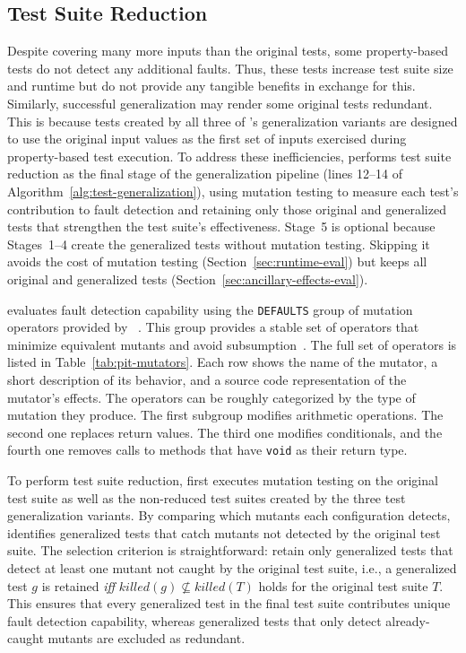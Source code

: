 \subsection{Test Suite Reduction}
\label{sec:test-suite-reduction}

Despite covering many more inputs than the original tests,
some property-based tests do not detect any additional faults.
Thus, these tests increase test suite size and runtime
but do not provide any tangible benefits in exchange for this.
Similarly, successful generalization may render some original tests redundant.
This is because tests created by all three of \ToolTeralizer{}'s generalization variants
are designed to use the original input values as the first
set of inputs exercised during property-based test execution.
To address these inefficiencies,
\ToolTeralizer{} performs test suite reduction
as the final stage of the generalization pipeline
(lines 12--14 of Algorithm~\ref{alg:test-generalization}),
using mutation testing to measure each test's contribution to fault detection
and retaining only those original and generalized tests
that strengthen the test suite's effectiveness.
Stage~5 is optional because Stages~1--4 create the generalized tests without mutation testing.
Skipping it avoids the cost of mutation testing (Section~\ref{sec:runtime-eval})
but keeps all original and generalized tests (Section~\ref{sec:ancillary-effects-eval}).

\ToolTeralizer{} evaluates fault detection capability
using the \texttt{DEFAULTS} group of mutation operators
provided by \ToolPit{}~\cite{coles_2016_pit}.
This group provides a stable set of operators that minimize equivalent mutants
and avoid subsumption~\cite{coles_2021_less_is_more, coles_pit_mutators}.
The full set of operators
is listed in Table~\ref{tab:pit-mutators}.
Each row shows the name of the mutator,
a short description of its behavior,
and a source code representation
of the mutator's effects.
The operators can be roughly categorized by the type of mutation they produce.
The first subgroup modifies arithmetic operations.
The second one replaces return values.
The third one modifies conditionals,
and the fourth one removes calls to methods
that have \texttt{void} as their return type.

To perform test suite reduction, \ToolTeralizer{}
first executes mutation testing on the original
test suite as well as the non-reduced test suites
created by the three test generalization variants.
By comparing which mutants each configuration detects,
\ToolTeralizer{} identifies generalized tests
that catch mutants not detected by the original test suite.
The selection criterion is straightforward:
retain only generalized tests that detect at least one mutant
not caught by the original test suite,
i.e., a generalized test $g$ is retained \emph{iff}
$\mathit{killed}(g) \not\subseteq \mathit{killed}(T)$
holds for the original test suite $T$.
This ensures that every generalized test in the final test suite
contributes unique fault detection capability,
whereas generalized tests that only detect already-caught mutants are excluded as redundant.


